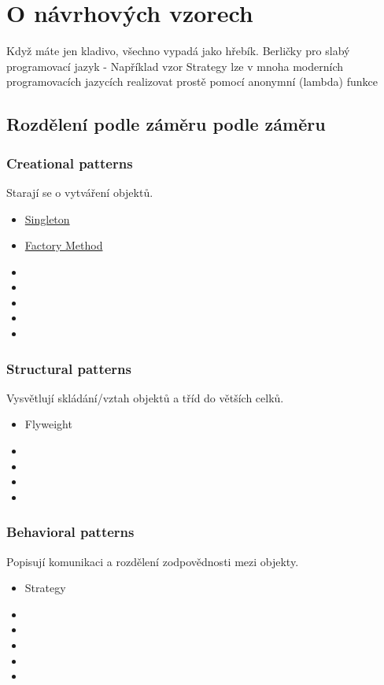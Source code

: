 \documentclass{article}
\begin{document}
\section{O návrhových vzorech}
Když máte jen kladivo, všechno vypadá jako hřebík.
Berličky pro slabý programovací jazyk - Například vzor Strategy lze v mnoha moderních programovacích jazycích realizovat prostě pomocí anonymní
(lambda) funkce

\subsection{Rozdělení podle záměru podle záměru}
\subsubsection{Creational patterns} 
Starají se o vytváření objektů.
\begin{itemize}
    \item \hyperref[Singleton]{Singleton}
    \item \hyperref[Factory Method]{Factory Method}
    \item  
    \item  
    \item  
    \item  
    \item  
\end{itemize}
\subsubsection{Structural patterns} 
Vysvětlují skládání/vztah objektů a tříd do větších celků.

\begin{itemize}
    \item Flyweight
    \item  
    \item  
    \item  
    \item  
    
\end{itemize}

\subsubsection{Behavioral patterns}
Popisují komunikaci a rozdělení zodpovědnosti mezi objekty.
\begin{itemize}
    \item Strategy
    \item  
    \item  
    \item  
    \item  
    \item  
\end{itemize}
\end{document}
